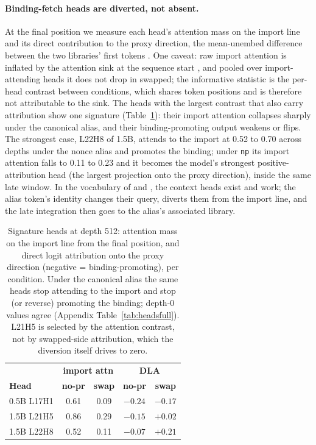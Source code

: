 \documentclass[11pt]{article}
\begin{document}
\paragraph{Binding-fetch heads are diverted, not absent.} At the final position we measure each head's attention mass on the import line and its direct contribution to the proxy direction, the mean-unembed difference between the two libraries' first tokens \citep{elhage2021mathematical}. One caveat: raw import attention is inflated by the attention sink at the sequence start \citep{xiao2024efficient}, and pooled over import-attending heads it does not drop in swapped; the informative statistic is the per-head contrast between conditions, which shares token positions and is therefore not attributable to the sink. The heads with the largest contrast that also carry attribution show one signature (Table~\ref{tab:heads}): their import attention collapses sharply under the canonical alias, and their binding-promoting output weakens or flips. The strongest case, L22H8 of 1.5B, attends to the import at 0.52 to 0.70 across depths under the nonce alias and promotes the binding; under \texttt{np} its import attention falls to 0.11 to 0.23 and it becomes the model's strongest positive-attribution head (the largest projection onto the proxy direction), inside the same late window. In the vocabulary of \citet{yu2023characterizing} and \citet{jin2024cutting}, the context heads exist and work; the alias token's identity changes their query, diverts them from the import line, and the late integration then goes to the alias's associated library.

\begin{table}[t]
\centering
\small
\begin{tabular}{lcccc}
\toprule
& \multicolumn{2}{c}{\textbf{import attn}} & \multicolumn{2}{c}{\textbf{DLA}} \\
\textbf{Head} & \textbf{no-pr} & \textbf{swap} & \textbf{no-pr} & \textbf{swap} \\
\midrule
0.5B L17H1 & 0.61 & 0.09 & $-0.24$ & $-0.17$ \\
1.5B L21H5 & 0.86 & 0.29 & $-0.15$ & $+0.02$ \\
1.5B L22H8 & 0.52 & 0.11 & $-0.07$ & $+0.21$ \\
\bottomrule
\end{tabular}
\caption{Signature heads at depth 512: attention mass on the import line from the final position, and direct logit attribution onto the proxy direction (negative = binding-promoting), per condition. Under the canonical alias the same heads stop attending to the import and stop (or reverse) promoting the binding; depth-0 values agree (Appendix Table~\ref{tab:headsfull}). L21H5 is selected by the attention contrast, not by swapped-side attribution, which the diversion itself drives to zero.}
\label{tab:heads}
\end{table}
\end{document}
